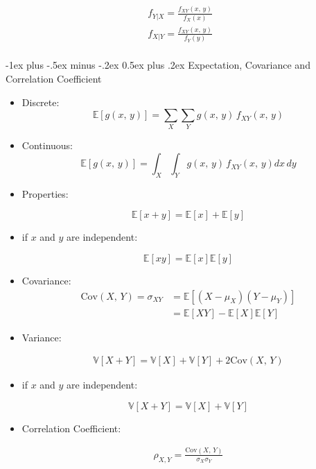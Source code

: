 \documentclass[a4paper]{article}
\makeatletter
\renewcommand{\section}{\@startsection{section}{1}{0mm}%
                                {-1ex plus -.5ex minus -.2ex}%
                                {0.5ex plus .2ex}%
                                {\normalfont\large\bfseries}}
\makeatother
\begin{document}
\begin{multicols}{3}
\begin{itemize}
\begin{align*}
f_{Y|X} = \frac{f_{XY}(x,\,y)}{f_X(x)}\\
f_{X|Y} = \frac{f_{XY}(x,\,y)}{f_Y(y)}\\
\end{align*}
\end{itemize}

\section{Expectation, Covariance and Correlation Coefficient }
\begin{itemize}

\item Discrete:
$$ \mathbb{E}[g(x,\,y)] = \sum_X \sum_Y g(x,\,y) \, f_{XY}(x,\,y) $$


\item Continuous:
$$ \mathbb{E}[g(x,\,y)] = \int_X \int_Y g(x,\,y) \, f_{XY}(x,\,y) dx\, dy $$

\item Properties:

$$ \mathbb{E}[x+y] =  \mathbb{E}[x] + \mathbb{E}[y]$$

\item if $x$ and $y$ are independent:

$$ \mathbb{E}[xy] =  \mathbb{E}[x] \mathbb{E}[y]$$

\item Covariance:
\begin{align*}
\text{Cov}(X,\,Y) = \sigma_{XY} &= \mathbb{E}[(X-\mu_X)(Y-\mu_Y)]\\
&= \mathbb{E}[XY] - \mathbb{E}[X]\mathbb{E}[Y]
\end{align*}

\item Variance:

\begin{align*}
\mathbb{V}[X+Y] = \mathbb{V}[X]  + \mathbb{V}[Y] +2 \text{Cov}(X,\,Y)
\end{align*}

\item if $x$ and $y$ are independent:

$$ \mathbb{V}[X+Y] = \mathbb{V}[X]  + \mathbb{V}[Y] $$

\item Correlation Coefficient:

\begin{align*}
\rho_{X,Y} = \frac{\text{Cov}(X,\,Y)}{\sigma_{X}\sigma_{Y}}
\end{align*}


\end{itemize}
\end{multicols}
\end{document}
